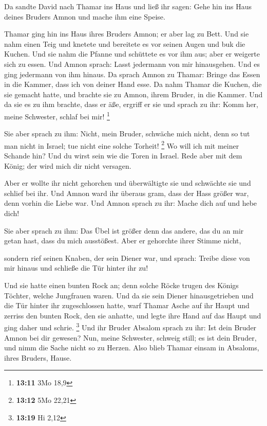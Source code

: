  Da sandte David nach Thamar ins Haus und ließ ihr sagen:
Gehe hin ins Haus deines Bruders Amnon und mache ihm eine Speise.

 Thamar ging hin ins Haus ihres Bruders Amnon; er aber lag
zu Bett. Und sie nahm einen Teig und knetete und bereitete es vor seinen
Augen und buk die Kuchen.  Und sie nahm die Pfanne und
schüttete es vor ihm aus; aber er weigerte sich zu essen. Und Amnon
sprach: Lasst jedermann von mir hinausgehen. Und es ging jedermann von
ihm hinaus.  Da sprach Amnon zu Thamar: Bringe das Essen in
die Kammer, dass ich von deiner Hand esse. Da nahm Thamar die Kuchen,
die sie gemacht hatte, und brachte sie zu Amnon, ihrem Bruder, in die
Kammer.  Und da sie es zu ihm brachte, dass er äße, ergriff
er sie und sprach zu ihr: Komm her, meine Schwester, schlaf bei mir!
\footnote{\textbf{13:11} 3Mo 18,9}

 Sie aber sprach zu ihm: Nicht, mein Bruder, schwäche mich
nicht, denn so tut man nicht in Israel; tue nicht eine solche Torheit!
\footnote{\textbf{13:12} 5Mo 22,21}  Wo will ich mit meiner
Schande hin? Und du wirst sein wie die Toren in Israel. Rede aber mit
dem König; der wird mich dir nicht versagen.

 Aber er wollte ihr nicht gehorchen und überwältigte sie
und schwächte sie und schlief bei ihr.  Und Amnon ward ihr
überaus gram, dass der Hass größer war, denn vorhin die Liebe war. Und
Amnon sprach zu ihr: Mache dich auf und hebe dich!

 Sie aber sprach zu ihm: Das Übel ist größer denn das
andere, das du an mir getan hast, dass du mich ausstößest. Aber er
gehorchte ihrer Stimme nicht,

 sondern rief seinen Knaben, der sein Diener war, und
sprach: Treibe diese von mir hinaus und schließe die Tür hinter ihr zu!

 Und sie hatte einen bunten Rock an; denn solche Röcke
trugen des Königs Töchter, welche Jungfrauen waren. Und da sie sein
Diener hinausgetrieben und die Tür hinter ihr zugeschlossen hatte,
 warf Thamar Asche auf ihr Haupt und zerriss den bunten
Rock, den sie anhatte, und legte ihre Hand auf das Haupt und ging daher
und schrie. \footnote{\textbf{13:19} Hi 2,12}  Und ihr
Bruder Absalom sprach zu ihr: Ist dein Bruder Amnon bei dir gewesen?
Nun, meine Schwester, schweig still; es ist dein Bruder, und nimm die
Sache nicht so zu Herzen. Also blieb Thamar einsam in Absaloms, ihres
Bruders, Hause.

